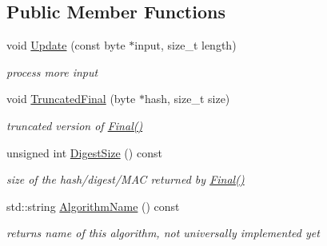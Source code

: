\subsection*{Public Member Functions}
\begin{DoxyCompactItemize}
\item 
\hypertarget{class_adler32_a84c3d47f039beab76b5f902ff558ac49}{
void \hyperlink{class_adler32_a84c3d47f039beab76b5f902ff558ac49}{Update} (const byte $\ast$input, size\_\-t length)}
\label{class_adler32_a84c3d47f039beab76b5f902ff558ac49}

\begin{DoxyCompactList}\small\item\em process more input \item\end{DoxyCompactList}\item 
\hypertarget{class_adler32_ae6c17afdf6aeb8b58d771932551b07fa}{
void \hyperlink{class_adler32_ae6c17afdf6aeb8b58d771932551b07fa}{TruncatedFinal} (byte $\ast$hash, size\_\-t size)}
\label{class_adler32_ae6c17afdf6aeb8b58d771932551b07fa}

\begin{DoxyCompactList}\small\item\em truncated version of \hyperlink{class_hash_transformation_aa0b8c7a110d8968268fd02ec32b9a8e8}{Final()} \item\end{DoxyCompactList}\item 
\hypertarget{class_adler32_afe40f0e26a5c9030fe0848da84659060}{
unsigned int \hyperlink{class_adler32_afe40f0e26a5c9030fe0848da84659060}{DigestSize} () const }
\label{class_adler32_afe40f0e26a5c9030fe0848da84659060}

\begin{DoxyCompactList}\small\item\em size of the hash/digest/MAC returned by \hyperlink{class_hash_transformation_aa0b8c7a110d8968268fd02ec32b9a8e8}{Final()} \item\end{DoxyCompactList}\item 
\hypertarget{class_adler32_a1528e4e88f83326a7406fa448840fda6}{
std::string \hyperlink{class_adler32_a1528e4e88f83326a7406fa448840fda6}{AlgorithmName} () const }
\label{class_adler32_a1528e4e88f83326a7406fa448840fda6}

\begin{DoxyCompactList}\small\item\em returns name of this algorithm, not universally implemented yet \item\end{DoxyCompactList}\end{DoxyCompactItemize}
